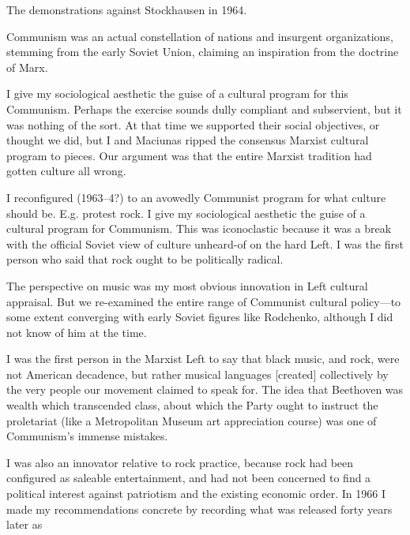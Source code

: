 \Pb 

The demonstrations against Stockhausen in 1964.


Communism was an actual constellation of nations and insurgent organizations, stemming from the early Soviet Union, claiming an inspiration from the doctrine of Marx. 

I give my sociological aesthetic the guise of a cultural program for this Communism.  Perhaps the exercise sounds dully compliant and subservient, but it was nothing of the sort.  At that time we supported their social objectives, or thought we did, but I and Maciunas ripped the consensus Marxist cultural program to pieces.  Our argument was that the entire Marxist tradition had gotten culture all wrong.

I reconfigured  (1963--4?) to an avowedly Communist program for what culture should be.  E.g. protest rock.  I give my sociological aesthetic the guise of a cultural program for Communism.  This was iconoclastic because it was a break with the official Soviet view of culture unheard-of on the hard Left.  I was the first person who said that rock ought to be politically radical.

The perspective on music was my most obvious innovation in Left cultural appraisal.  But we re-examined the entire range of Communist cultural policy---to some extent converging with early Soviet figures like Rodchenko, although I did not know of him at the time.

I was the first person in the Marxist Left to say that black music, and rock, were not American decadence, but rather musical languages [created] collectively by the very people our movement claimed to speak for.  The idea that Beethoven was wealth which transcended class, about which the Party ought to instruct the proletariat (like a Metropolitan Museum art appreciation course) was one of Communism's immense mistakes. 

I was also an innovator relative to rock practice, because rock had been configured as saleable entertainment, and had not been concerned to find a political interest against patriotism and the existing economic order. In 1966 I made my recommendations concrete by recording what was released forty years later as 

